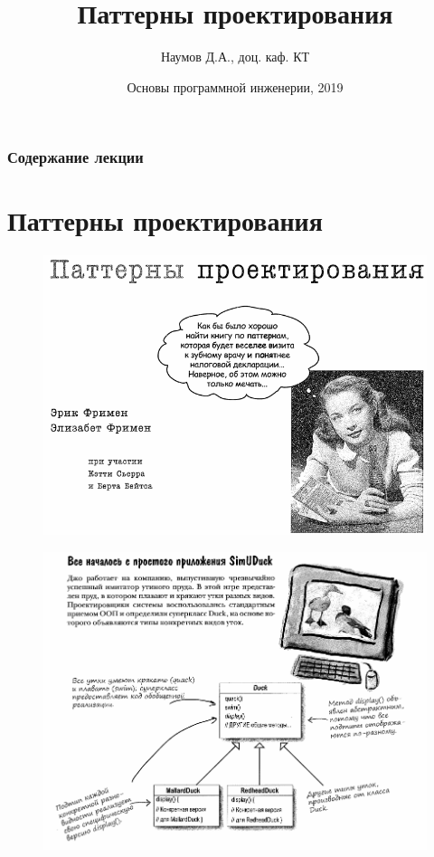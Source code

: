 \documentclass{beamer}
\title[Software Design]{Паттерны проектирования}
\author{Наумов Д.А., доц. каф. КТ}
\date[03.12.2019] {Основы программной инженерии, 2019}
\begin{document}
\begin{frame}
  \titlepage
\end{frame}
  
\begin{frame}
  \frametitle{Содержание лекции}
  \tableofcontents  
\end{frame}

\section{Паттерны проектирования}

\begin{frame}
\begin{figure}[h]
\centering
\includegraphics[scale=0.5]{images/lec09-pic01.png}
\label{pic-sort}
\end{figure}
\end{frame}

\begin{frame}
\begin{figure}[h]
\centering
\includegraphics[scale=0.5]{images/lec09-pic02.png}
\label{pic-sort}
\end{figure}
\end{frame}
\end{document}
